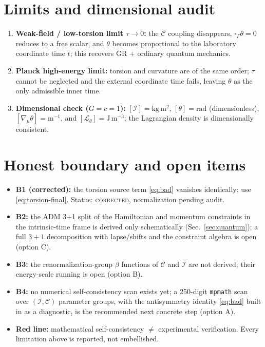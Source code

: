 \documentclass[11pt]{article}
\newcommand{\I}{\mathcal{I}}
\newcommand{\C}{\mathcal{C}}
\begin{document}
\section{Limits and dimensional audit}
\label{sec:limits}
\begin{enumerate}
\item \textbf{Weak-field / low-torsion limit $\tau\to0$:} the $\C$ coupling disappears,
  $\square_\Gamma\theta=0$ reduces to a free scalar, and $\theta$ becomes proportional to the
  laboratory coordinate time $t$; this recovers GR + ordinary quantum mechanics.
\item \textbf{Planck high-energy limit:} torsion and curvature are of the same order; $\tau$
  cannot be neglected and the external coordinate time fails, leaving $\theta$ as the only
  admissible inner time.
\item \textbf{Dimensional check ($G=c=1$):} $[\I]=\mathrm{kg\,m^2}$, $[\theta]=\mathrm{rad}$
  (dimensionless), $[\nabla_\mu\theta]=\mathrm{m^{-1}}$, and
  $[\mathcal{L}_\theta]=\mathrm{J\,m^{-3}}$; the Lagrangian density is dimensionally
  consistent.
\end{enumerate}

\section{Honest boundary and open items}
\label{sec:boundary}
\begin{itemize}
\item \textbf{B1 (corrected):} the torsion source term \eqref{eq:bad} vanishes identically; use
  \eqref{eq:torsion-final}. Status: \textsc{corrected}, normalization pending audit.
\item \textbf{B2:} the ADM 3+1 split of the Hamiltonian and momentum constraints in the
  intrinsic-time frame is derived only schematically (Sec.~\ref{sec:quantum}); a full
  $3+1$ decomposition with lapse/shifts and the constraint algebra is open (option C).
\item \textbf{B3:} the renormalization-group $\beta$ functions of $\C$ and $\I$ are not
  derived; their energy-scale running is open (option B).
\item \textbf{B4:} no numerical self-consistency scan exists yet; a 250-digit \texttt{mpmath}
  scan over $(\I,\C)$ parameter groups, with the antisymmetry identity \eqref{eq:bad} built in
  as a diagnostic, is the recommended next concrete step (option A).
\item \textbf{Red line:} mathematical self-consistency $\neq$ experimental verification. Every
  limitation above is reported, not embellished.
\end{itemize}
\end{document}
